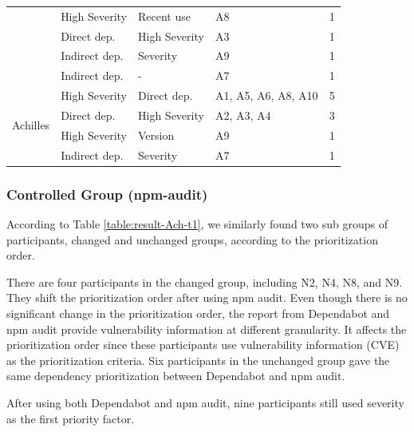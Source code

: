 \documentclass[conference]{IEEEtran}
\begin{document}
\begin{table}[tb]
{\begin{tabular}{cp{2cm}p{2cm}p{1.5cm}r}
				& High Severity & Recent use                      & A8                                            & 1               \\ 
				& Direct dep.  & High Severity                   & A3                                            & 1               \\ 
				& Indirect dep. & Severity                        & A9                                            & 1               \\ 
				& Indirect dep. & - & A7                                            & 1               \\ 
				\midrule
				\multirow{5}{*}{Achilles}  & High Severity & Direct dep.                          & A1, A5, A6, A8, A10                           & 5               \\ 
				& Direct dep.  & High Severity                   & A2, A3, A4 & 3               \\ 
				& High Severity & Version                         & A9                                            & 1               \\ 
				& Indirect dep. & Severity                        & A7                                            & 1               \\ 
				\bottomrule
	\end{tabular}
}
	\label{table:prioritization_factor}
\end{table}
	
	\subsubsection{Controlled Group (npm-audit)}
	According to Table \ref{table:result-Ach-t1}, we similarly found two sub groups of participants, changed and unchanged groups, according to the prioritization order.
	
	There are four participants in the changed group, including N2, N4, N8, and N9. They shift the prioritization order after using npm audit. Even though there is no significant change in the prioritization order, the report from Dependabot and npm audit provide vulnerability information at different granularity. It affects the prioritization order since these participants use vulnerability information (CVE) as the prioritization criteria. Six participants in the unchanged group gave the same dependency prioritization between Dependabot and npm audit.
	
	After using both Dependabot and npm audit, nine participants still used severity as the first priority factor.
	
\end{document}
